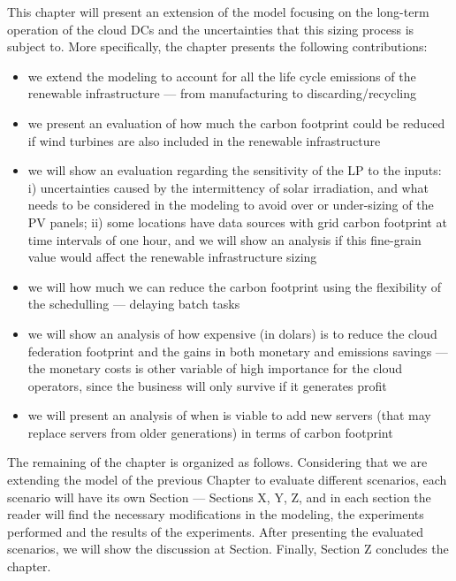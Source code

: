 This chapter will present an extension of the model focusing on the long-term operation of the cloud DCs and the uncertainties that this sizing process is subject to. More specifically, the chapter presents the following contributions:

\begin{itemize}
 
\item we extend the modeling to account for all the life cycle emissions of the renewable infrastructure --- from manufacturing to discarding/recycling

\item we present an evaluation of how much the carbon footprint could be reduced if wind turbines are also included in the renewable infrastructure 

\item we will show an evaluation regarding the sensitivity of the LP to the inputs: i) uncertainties caused by the intermittency of solar irradiation, and what needs to be considered in the modeling to avoid over or under-sizing of the PV panels; ii) some locations have data sources with grid carbon footprint at time intervals of one hour, and we will show an analysis if this fine-grain value would affect the renewable infrastructure sizing
  
\item we will how much we can reduce the carbon footprint using the flexibility of the schedulling --- delaying batch tasks 
 
\item we will show an analysis of how expensive (in dolars) is to reduce the cloud federation footprint and the gains in both monetary and emissions savings --- the monetary costs is other variable of high importance for the cloud operators, since the business will only survive if it generates profit

\item we will present an analysis of when is viable to add new servers (that may replace servers from older generations) in terms of carbon footprint

 
\end{itemize}

The remaining of the chapter is organized as follows. Considering that we are extending the model of the previous Chapter to evaluate different scenarios, each scenario will have its own Section --- Sections X, Y, Z, and in each section the reader will find the necessary modifications in the modeling, the experiments performed and the results of the experiments. After presenting the evaluated scenarios, we will show the discussion at Section. Finally, Section Z concludes the chapter.

